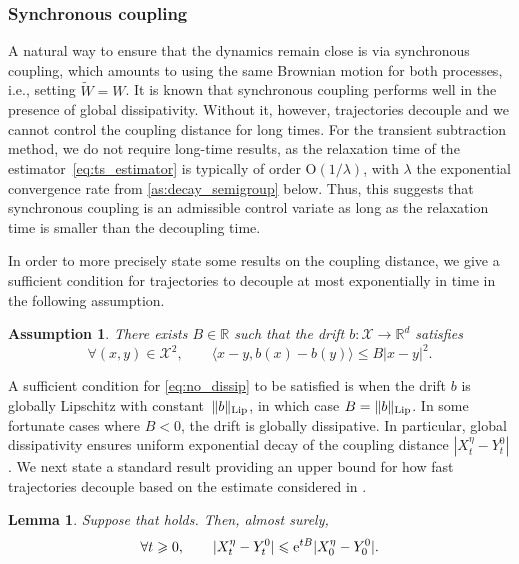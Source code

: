 \documentclass[11pt]{article}
\newcommand{\R}{\mathbb{R}}
\newcommand{\e}{\mathrm{e}}
\newcommand{\bigO}{\mathrm{O}}
\renewcommand{\geq}{\geqslant}
\renewcommand{\leq}{\leqslant}
\newtheorem{assumption}{Assumption}
\newtheorem{lemma}{Lemma}
\theoremstyle{definition}
\newcommand{\bLip}{\|b\|_{\rm Lip}}
\begin{document}
\subsubsection{Synchronous coupling}
\label{subsubsec:synchronous_coup}
A natural way to ensure that the dynamics remain close is via synchronous coupling, which amounts to using the same Brownian motion for both processes, i.e., setting $\widetilde{W} = W$. It is known that synchronous coupling performs well in the presence of global dissipativity. Without it, however, trajectories decouple and we cannot control the coupling distance for long times. For the transient subtraction method, we do not require long-time results, as the relaxation time of the estimator~\eqref{eq:ts_estimator} is typically of order $\bigO(1/\lambda)$, with $\lambda$ the exponential convergence rate from \cref{as:decay_semigroup} below. Thus, this suggests that synchronous coupling is an admissible control variate as long as the relaxation time is smaller than the decoupling time.

In order to more precisely state some results on the coupling distance, we give a sufficient condition for trajectories to decouple at most exponentially in time in the following assumption.

\begin{assumption}
\label{as:contractivity}
	There exists $B\in\R$ such that the drift $b\colon \mathcal{X} \to \R^d$ satisfies
\begin{equation}
		\forall (x,y) \in \mathcal{X}^2, \qquad \langle x-y, b(x)-b(y)\rangle \leq B|x-y|^2.
		\label{eq:no_dissip}
	\end{equation}
\end{assumption}

A sufficient condition for \eqref{eq:no_dissip} to be satisfied is when the drift $b$ is globally Lipschitz with constant~$\bLip$, in which case $B = \bLip$. In some fortunate cases where $B<0$, the drift is globally dissipative. In particular, global dissipativity ensures uniform exponential decay of the coupling distance $|X_t^\eta - Y_t^0|$.  We next state a standard result providing an upper bound for how fast trajectories decouple based on the estimate considered in .

\begin{lemma}
	\label{lemma:decoupling_times}
	Suppose that  holds. Then, almost surely,
\begin{equation}
\notag
\forall t\geq 0, \qquad |X_t^\eta - Y_t^0| \leq \e^{tB}|X_0^\eta - Y_0^0|.
	\end{equation}
\end{lemma}
\end{document}
